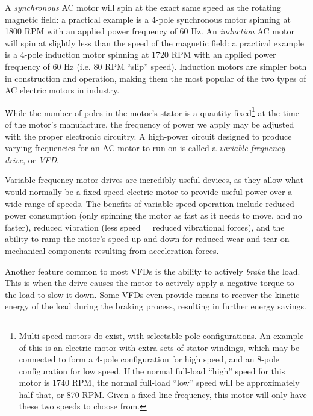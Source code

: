 A \textit{synchronous} AC motor will spin at the exact same speed as the rotating magnetic field: a practical example is a 4-pole synchronous motor spinning at 1800 RPM with an applied power frequency of 60 Hz.  An \textit{induction} AC motor will spin at slightly less than the speed of the magnetic field: a practical example is a 4-pole induction motor spinning at 1720 RPM with an applied power frequency of 60 Hz (i.e. 80 RPM ``slip'' speed).  Induction motors are simpler both in construction and operation, making them the most popular of the two types of AC electric motors in industry.  

\vskip 10pt

While the number of poles in the motor's stator is a quantity fixed\footnote{Multi-speed motors do exist, with selectable pole configurations.  An example of this is an electric motor with extra sets of stator windings, which may be connected to form a 4-pole configuration for high speed, and an 8-pole configuration for low speed.  If the normal full-load ``high'' speed for this motor is 1740 RPM, the normal full-load ``low'' speed will be approximately half that, or 870 RPM.  Given a fixed line frequency, this motor will only have these two speeds to choose from.} at the time of the motor's manufacture, the frequency of power we apply may be adjusted with the proper electronic circuitry.  A high-power circuit designed to produce varying frequencies for an AC motor to run on is called a \textit{variable-frequency drive}, or \textit{VFD}.    

Variable-frequency motor drives are incredibly useful devices, as they allow what would normally be a fixed-speed electric motor to provide useful power over a wide range of speeds.  The benefits of variable-speed operation include reduced power consumption (only spinning the motor as fast as it needs to move, and no faster), reduced vibration (less speed = reduced vibrational forces), and the ability to ramp the motor's speed up and down for reduced wear and tear on mechanical components resulting from acceleration forces.

\vskip 10pt

Another feature common to most VFDs is the ability to actively \textit{brake} the load.  This is when the drive causes the motor to actively apply a negative torque to the load to slow it down.  Some VFDs even provide means to recover the kinetic energy of the load during the braking process, resulting in further energy savings.

